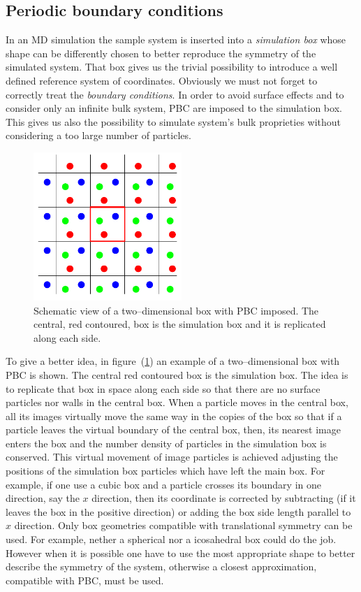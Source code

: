 \subsection{Periodic boundary conditions}
In an \ac{MD} simulation the sample system is inserted into a \textit{simulation box} whose shape can be 
differently chosen to better reproduce the symmetry of the simulated system. That box gives us the trivial 
possibility to introduce a well defined reference system of coordinates. Obviously we must not forget to 
correctly treat the \textit{boundary conditions}. In order to avoid surface effects and to consider only an 
infinite bulk system, \ac{PBC} are imposed to the simulation box. This gives us also the possibility to simulate 
system's bulk proprieties without considering a too large number of particles.
\begin{figure}
	\includegraphics[width=0.5\textwidth]{./img/PBCScheme/PBCScheme}
	\caption{Schematic view of a two--dimensional box with \acs{PBC} imposed. The central, red contoured, box is the simulation box and it is replicated along each side.}
	\label{fig:pbc}
\end{figure}
To give a better idea, in figure~(\ref{fig:pbc}) an example of a two--dimensional box with \ac{PBC} is shown. The 
central red contoured box is the simulation box. The idea is to replicate that box in space along each side so 
that there are no surface particles nor walls in the central box. When a particle moves in the central box, all 
its images virtually move the same way in the copies of the box so that if a particle leaves the virtual boundary 
of the central box, then, its nearest image enters the box and the number density of particles in the simulation 
box is conserved. This virtual movement of image particles is achieved adjusting the positions of the simulation 
box particles which have left the main box. For example, if one use a cubic box and a particle crosses its 
boundary in one direction, say the $x$ direction, then its coordinate is corrected by subtracting (if it leaves 
the box in the positive direction) or adding the box side length parallel to $x$ direction. Only box geometries 
compatible with translational symmetry can be used. For example, nether a spherical nor a icosahedral box could 
do the job. However when it is possible one have to use the most appropriate shape to better describe the 
symmetry of the system, otherwise a closest approximation, compatible with \ac{PBC}, must be used.

